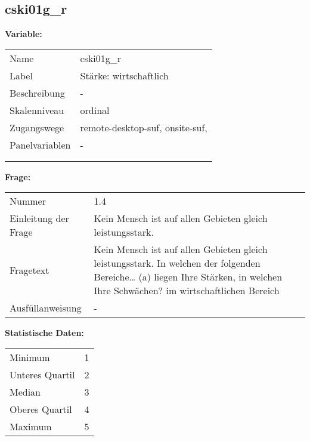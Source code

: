 	
	
	\subsection{cski01g\_r}
	\label{subSection:cski01g_r}

	\noindent\textbf{Variable:}\\
		\begin{tabular}{lL{11.3cm}}
			\label{tableVariable:cski01g_r}
			Name & cski01g\_r \\
			Label & Stärke: wirtschaftlich \\
			Beschreibung & - \\
			Skalenniveau & ordinal \\
			Zugangswege &
				remote-desktop-suf,
				onsite-suf,
 \\
			Panelvariablen & -
			 \\
			 \\
 \\
		\end{tabular}

		\vspace*{1 cm}
		\noindent\textbf{Frage:}\\
		\begin{tabular}{lL{11.3cm}}
			\label{tableQuestion:cski01g_r}
			Nummer & 1.4 \\
			Einleitung der Frage & Kein Mensch ist auf allen Gebieten gleich leistungsstark. \\
			Fragetext & Kein Mensch ist auf allen Gebieten gleich leistungsstark. In welchen der folgenden Bereiche…
(a) liegen Ihre Stärken, in welchen Ihre Schwächen?
im wirtschaftlichen Bereich \\
			Ausfüllanweisung & - \\
		\end{tabular}


		\vspace*{1 cm}
		\noindent\textbf{Statistische Daten:}\\
			\begin{tabular}{ll}
				\label{tableStatistics:cski01g_r}
					Minimum & 1 \\
					Unteres Quartil & 2 \\
					Median & 3 \\
					Oberes Quartil & 4 \\
					Maximum & 5 \\
			\end{tabular}




